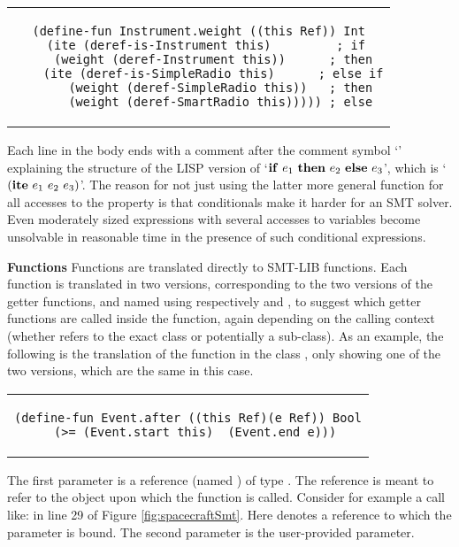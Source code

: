 \begin{center}
\begin{tabular}{c}
\begin{lstlisting}
(define-fun Instrument.weight ((this Ref)) Int
  (ite (deref-is-Instrument this)         ; if
    (weight (deref-Instrument this))      ; then
    (ite (deref-is-SimpleRadio this)      ; else if
      (weight (deref-SimpleRadio this))   ; then
      (weight (deref-SmartRadio this))))) ; else
\end{lstlisting}
\end{tabular}
\end{center}

\noindent Each line in the body ends with a comment after the comment
symbol `\code{;}' explaining the structure of the LISP version of
`${\bf if}\ e_1\ {\bf then}\ e_2\ {\bf else}\ e_3$', which is `$({\bf
  ite}\ e_1\ e_2\ e_3)$'. The reason for not just using the latter
more general function  for all accesses to the
 property is that conditionals make it harder for an SMT
solver. Even moderately sized expressions with several accesses to
variables become unsolvable in reasonable time in the presence of such
conditional expressions.

\textbf{Functions} Functions are translated directly to SMT-LIB
functions.  Each function is translated in two versions, corresponding
to the two versions of the getter functions, and named using
respectively  and
, to suggest which getter functions are
called inside the function, again depending on the calling context
(whether  refers to the exact class or potentially a
sub-class). As an example, the following is the translation of the
 function in the class , only showing one of
the two versions, which are the same in this case.

\begin{center}
\begin{tabular}{c}
\begin{lstlisting}
(define-fun Event.after ((this Ref)(e Ref)) Bool
  (>= (Event.start this)  (Event.end e)))
\end{lstlisting}
\end{tabular}
\end{center}

\noindent The first parameter is a reference (named ) of
type . The  reference is meant to refer to the
object upon which the function is called. Consider for example a call
like:  in line 29 of Figure
\ref{fig:spacecraftSmt}. Here  denotes a reference
to which the parameter  is bound.  The second parameter is
the user-provided parameter.

